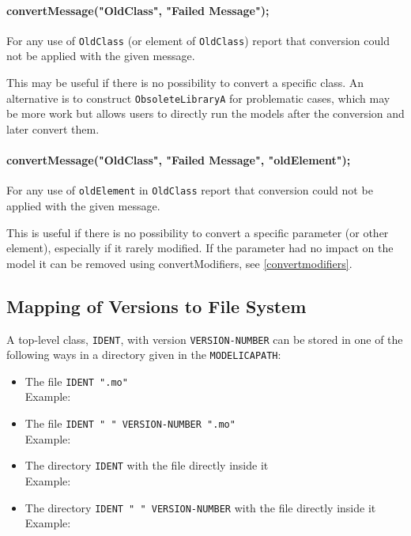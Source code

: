 \paragraph*{convertMessage("OldClass", "Failed Message");}\label{convertmessageoldclass-failed-message}

For any use of \lstinline!OldClass! (or element of \lstinline!OldClass!) report that conversion
could not be applied with the given message.

\begin{nonnormative}
This may be useful if there is no possibility to convert a specific class. An alternative is to construct \lstinline!ObsoleteLibraryA! for problematic
cases, which may be more work but allows users to directly run the models after the conversion and later convert them.
\end{nonnormative}

\paragraph*{convertMessage("OldClass", "Failed Message", "oldElement");}\label{convertmessageoldclass-failed-message2}

For any use of \lstinline!oldElement! in \lstinline!OldClass! report that conversion
could not be applied with the given message.

\begin{nonnormative}
This is useful if there is no possibility to convert a specific parameter (or other element),
especially if it rarely modified. If the parameter had no impact on the model it can be removed
using convertModifiers, see \cref{convertmodifiers}.
\end{nonnormative}

\subsection{Mapping of Versions to File System}\label{mapping-of-versions-to-file-system}

A top-level class, \lstinline!IDENT!, with version \lstinline!VERSION-NUMBER! can be stored in
one of the following ways in a directory given in the \lstinline!MODELICAPATH!:
\begin{itemize}
\item
  The file \lstinline!IDENT ".mo"!\\
  Example: 
\item
  The file \lstinline!IDENT " " VERSION-NUMBER ".mo"!\\
  Example: 
\item
  The directory \lstinline!IDENT! with the file  directly inside it\\
  Example: 
\item
  The directory \lstinline!IDENT " " VERSION-NUMBER! with the file  directly inside it\\
  Example: 
\end{itemize}

